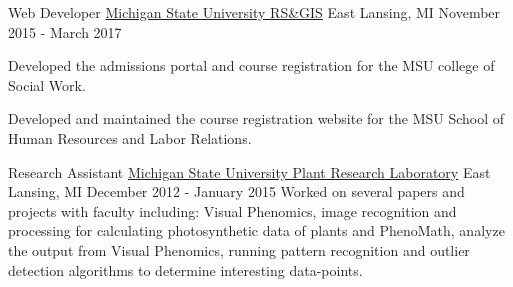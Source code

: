 \begin{cventries}
  \cventry
    {Web Developer}
    {\href{http://www.rsgis.msu.edu}{Michigan State University RS\&GIS}}
    {East Lansing, MI}
    {November 2015 - March 2017}
    {
      \begin{cvitems}
        \item {Developed the admissions portal and course registration for the MSU college of Social Work.}
        \item {Developed and maintained the course registration website for the MSU School of Human Resources and Labor Relations.}
      \end{cvitems}
    }

  \cventry
    {Research Assistant}
    {\href{https://prl.natsci.msu.edu/}{Michigan State University Plant Research Laboratory}}
    {East Lansing, MI}
    {December 2012 - January 2015}
    {
      {Worked on several papers and projects with faculty including: Visual Phenomics, image recognition
      and processing for calculating photosynthetic data of plants and PhenoMath, analyze the output from Visual Phenomics,
      running pattern recognition and outlier detection algorithms to determine interesting data-points. }
    }
\end{cventries}
